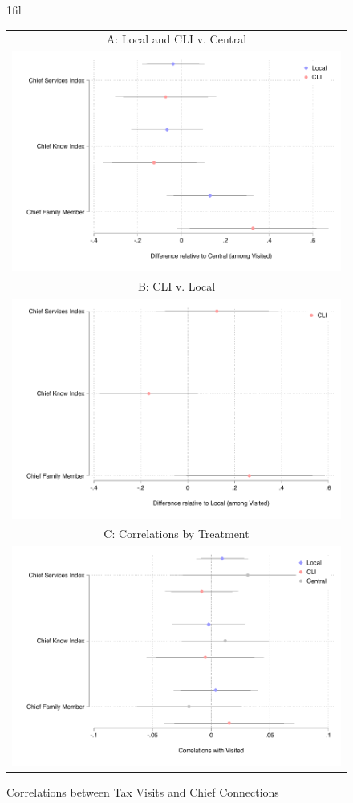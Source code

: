 \documentclass[12pt,english]{article}
\makeatletter
\newcommand*{\centerfloat}{%
  \parindent \z@
  \leftskip \z@ \@plus 1fil \@minus \textwidth
  \rightskip\leftskip
  \parfillskip \z@skip}
\makeatother
\begin{document}
\begin{figure}[H]
\centering{}\caption{Correlations between Tax Visits and Chief Connections
\label{main_targeting_chiefchar_appendix}}
\centering
\centerfloat
\begin{tabular}{c}
A: Local and CLI v. Central \\
\includegraphics[scale=.55]{Output/chief_indices_CvL.pdf} \\
B: CLI v. Local \\
\includegraphics[scale=.55]{Output/chief_indices_LvCLI.pdf}\\
C: Correlations by Treatment\\
\includegraphics[scale=.55]{Output/chief_indices_bytmt.pdf}\\

\end{tabular}
\end{figure}
\end{document}
